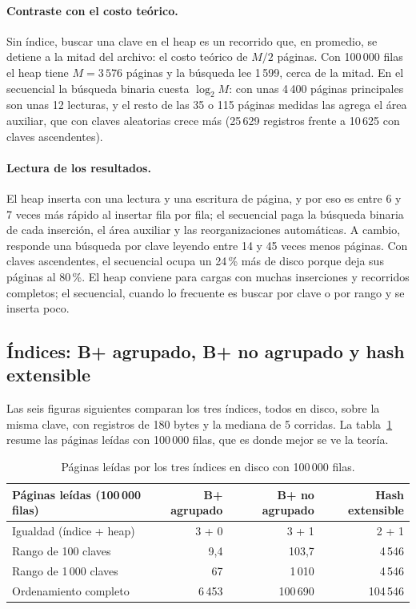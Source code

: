 \documentclass[11pt,a4paper]{article}
\begin{document}
\paragraph{Contraste con el costo teórico.} Sin índice, buscar una clave en el heap es un recorrido que, en promedio, se detiene a la mitad del archivo: el costo teórico de $M/2$ páginas. Con 100\,000 filas el heap tiene $M = 3\,576$ páginas y la búsqueda lee 1\,599, cerca de la mitad. En el secuencial la búsqueda binaria cuesta $\log_2 M$: con unas 4\,400 páginas principales son unas 12 lecturas, y el resto de las 35 o 115 páginas medidas las agrega el área auxiliar, que con claves aleatorias crece más (25\,629 registros frente a 10\,625 con claves ascendentes).

\paragraph{Lectura de los resultados.} El heap inserta con una lectura y una escritura de página, y por eso es entre 6 y 7 veces más rápido al insertar fila por fila; el secuencial paga la búsqueda binaria de cada inserción, el área auxiliar y las reorganizaciones automáticas. A cambio, responde una búsqueda por clave leyendo entre 14 y 45 veces menos páginas. Con claves ascendentes, el secuencial ocupa un 24\,\% más de disco porque deja sus páginas al 80\,\%. El heap conviene para cargas con muchas inserciones y recorridos completos; el secuencial, cuando lo frecuente es buscar por clave o por rango y se inserta poco.

\subsection{Índices: B+ agrupado, B+ no agrupado y hash extensible}

Las seis figuras siguientes comparan los tres índices, todos en disco, sobre la misma clave, con registros de 180 bytes y la mediana de 5 corridas. La tabla~\ref{tab:indices-paginas} resume las páginas leídas con 100\,000 filas, que es donde mejor se ve la teoría.

\begin{table}[H]
\centering
\small
\begin{tabular}{lrrr}
\toprule
Páginas leídas (100\,000 filas) & B+ agrupado & B+ no agrupado & Hash extensible \\
\midrule
Igualdad (índice + heap) & 3 + 0 & 3 + 1 & 2 + 1 \\
Rango de 100 claves & 9,4 & 103,7 & 4\,546 \\
Rango de 1\,000 claves & 67 & 1\,010 & 4\,546 \\
Ordenamiento completo & 6\,453 & 100\,690 & 104\,546 \\
\bottomrule
\end{tabular}
\caption{Páginas leídas por los tres índices en disco con 100\,000 filas.}
\label{tab:indices-paginas}
\end{table}
\end{document}
